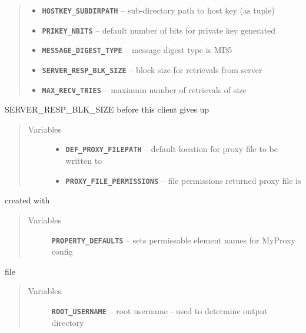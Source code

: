 \documentclass[letterpaper,10pt,english]{sphinxmanual}
\begin{document}
\begin{fulllineitems}
\begin{quote}
\begin{description}
\begin{itemize}
\item {} 
\textbf{\texttt{HOSTKEY\_SUBDIRPATH}} -- sub-directory path to host key (as tuple)

\item {} 
\textbf{\texttt{PRIKEY\_NBITS}} -- default number of bits for private key generated

\item {} 
\textbf{\texttt{MESSAGE\_DIGEST\_TYPE}} -- message digest type is MD5

\item {} 
\textbf{\texttt{SERVER\_RESP\_BLK\_SIZE}} -- block size for retrievals from server

\item {} 
\textbf{\texttt{MAX\_RECV\_TRIES}} -- maximum number of retrievals of size

\end{itemize}

\end{description}\end{quote}

SERVER\_RESP\_BLK\_SIZE before this client gives up
\begin{quote}\begin{description}
\item[{Variables}] \leavevmode\begin{itemize}
\item {} 
\textbf{\texttt{DEF\_PROXY\_FILEPATH}} -- default location for proxy file to be written to

\item {} 
\textbf{\texttt{PROXY\_FILE\_PERMISSIONS}} -- file permissions returned proxy file is

\end{itemize}

\end{description}\end{quote}

created with
\begin{quote}\begin{description}
\item[{Variables}] \leavevmode
\textbf{\texttt{PROPERTY\_DEFAULTS}} -- sets permissable element names for MyProxy config

\end{description}\end{quote}

file
\begin{quote}\begin{description}
\item[{Variables}] \leavevmode
\textbf{\texttt{ROOT\_USERNAME}} -- root username - used to determine output directory


\end{description}
\end{quote}
\end{fulllineitems}
\end{document}
